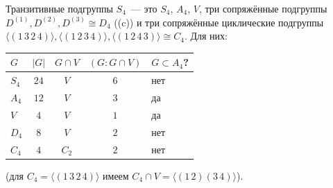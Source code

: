 \begin{proposition}[4.9b]
Транзитивные подгруппы $S_4$~--- это $S_4$, $A_4$, $V$, три сопряжённые подгруппы $D^{(1)},D^{(2)},D^{(3)}\cong D_4$ ((c)) и три
сопряжённые циклические подгруппы $\langle(1\,3\,2\,4)\rangle,\langle(1\,2\,3\,4)\rangle,\langle(1\,2\,4\,3)\rangle\cong C_4$. Для них:
\begin{center}
\begin{tabular}{@{}lcccl@{}}
\toprule
$G$ & $|G|$ & $G\cap V$ & $(G:G\cap V)$ & $G\subset A_4$?\\
\midrule
$S_4$ & $24$ & $V$ & $6$ & нет\\
$A_4$ & $12$ & $V$ & $3$ & да\\
$V$ & $4$ & $V$ & $1$ & да\\
$D_4$ & $8$ & $V$ & $2$ & нет\\
$C_4$ & $4$ & $C_2$ & $2$ & нет\\
\bottomrule
\end{tabular}
\end{center}
(для $C_4=\langle(1\,3\,2\,4)\rangle$ имеем $C_4\cap V=\langle(1\,2)(3\,4)\rangle$).
\end{proposition}

